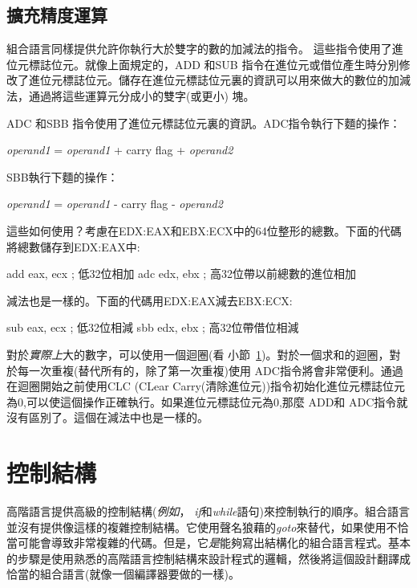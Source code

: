\subsection{擴充精度運算 \label{sec:ExtPrecArith} }

組合語言同樣提供允許你執行大於雙字的數的加減法的指令。 這些指令使用了進位元標誌位元。就像上面規定的，{\code ADD}
和{\code SUB} 指令在進位元或借位產生時分別修改了進位元標誌位元。儲存在進位元標誌位元裏的資訊可以用來做大的數位的加減法，通過將這些運算元分成小的雙字(或更小) 塊。

{\code ADC} 和{\code SBB} 指令使用了進位元標誌位元裏的資訊。{\code ADC}指令執行下麵的操作：
\begin{center}
{\code \emph{operand1} = \emph{operand1} + carry flag + \emph{operand2} }
\end{center}
{\code SBB}執行下麵的操作：
\begin{center}
{\code \emph{operand1} = \emph{operand1} - carry flag - \emph{operand2} }
\end{center}
這些如何使用？考慮在EDX:EAX和EBX:ECX中的64位整形的總數。下面的代碼將總數儲存到EDX:EAX中:
\begin{AsmCodeListing}[frame=none]
      add    eax, ecx       ; 低32位相加
      adc    edx, ebx       ; 高32位帶以前總數的進位相加
\end{AsmCodeListing}
減法也是一樣的。下面的代碼用EDX:EAX減去EBX:ECX:
\begin{AsmCodeListing}[frame=none]
      sub    eax, ecx       ; 低32位相減
      sbb    edx, ebx       ; 高32位帶借位相減
\end{AsmCodeListing}

對於\emph{實際上}大的數字，可以使用一個迴圈(看
小節~\ref{sec:control})。對於一個求和的迴圈，對於每一次重複(替代所有的，除了第一次重複)使用{\code
ADC}指令將會非常便利。通過在迴圈開始之前使用{\code CLC}
(CLear
Carry(清除進位元))指令初始化進位元標誌位元為0,可以使這個操作正確執行。如果進位元標誌位元為0,那麼{\code
ADD}和 {\code ADC}指令就沒有區別了。這個在減法中也是一樣的。
 

\section{控制結構}
\label{sec:control} 高階語言提供高級的控制結構(\emph{例如}，
\emph{if}和\emph{while}語句)來控制執行的順序。組合語言並沒有提供像這樣的複雜控制結構。它使用聲名狼藉的\emph{goto}來替代，如果使用不恰當可能會導致非常複雜的代碼。但是，它\emph{是}能夠寫出結構化的組合語言程式。基本的步驟是使用熟悉的高階語言控制結構來設計程式的邏輯，然後將這個設計翻譯成恰當的組合語言(就像一個編譯器要做的一樣)。

